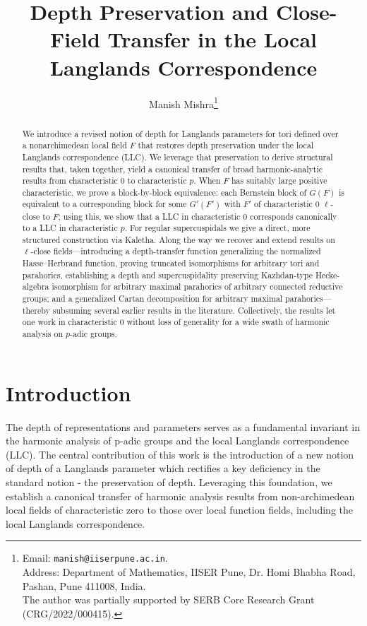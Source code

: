 \documentclass[american]{article}
\date{}
\title{Depth Preservation and Close-Field Transfer in the Local Langlands Correspondence}
\author{Manish Mishra\thanks{
Email: \texttt{manish@iiserpune.ac.in}.\\
Address: Department of Mathematics, IISER Pune, Dr. Homi Bhabha Road, Pashan, Pune 411008, India.\\
The author was partially supported by SERB Core Research Grant (CRG/2022/000415).
}}
\numberwithin{equation}{section}
\numberwithin{figure}{section}
\theoremstyle{plain}
\theoremstyle{definition}
\theoremstyle{remark}
\begin{document}
\maketitle

\begin{abstract}
We introduce a revised notion of depth for Langlands parameters for tori defined over a nonarchimedean local field \(F\) that restores depth preservation under the local Langlands correspondence (LLC). We leverage that preservation to derive structural results that, taken together, yield a canonical transfer of broad harmonic-analytic results from characteristic \(0\) to characteristic \(p\). When \(F\) has suitably large positive characteristic, we prove a block-by-block equivalence: each Bernstein block of  \(G(F)\) is equivalent to a corresponding block for some \(G'(F')\) with \(F'\) of characteristic \(0\) \(\ell\)-close to \(F\); using this, we show that a LLC in characteristic \(0\) corresponds canonically to a LLC in characteristic \(p\). For regular supercuspidals we give a direct, more structured construction via Kaletha. Along the way we recover and extend results on \(\ell\)-close fields---introducing a depth-transfer function generalizing the normalized Hasse--Herbrand function, proving truncated isomorphisms for arbitrary tori and parahorics, establishing a depth and supercuspidality preserving Kazhdan-type Hecke-algebra isomorphism for arbitrary maximal  parahorics of arbitrary connected reductive groups; and a generalized Cartan decomposition for arbitrary maximal parahorics---thereby subsuming several earlier results in the literature. Collectively, the results let one work in characteristic \(0\) without loss of generality for a wide swath of harmonic analysis on \(p\)-adic groups.
\end{abstract}


\tableofcontents

\section{Introduction}

The depth of representations and parameters serves as a fundamental invariant in the harmonic analysis of p-adic groups and the local Langlands correspondence (LLC). The central contribution of this work is the introduction of a new notion of depth of a Langlands parameter which rectifies a key deficiency in the standard notion - the preservation of depth. Leveraging this foundation, we establish a canonical transfer of harmonic analysis results from non-archimedean local fields of characteristic zero to those over local function fields, including the local Langlands correspondence. 
\end{document}

